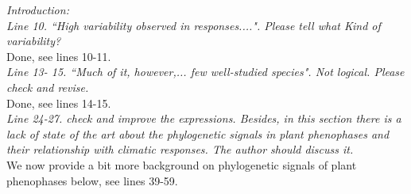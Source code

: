 \documentclass[11pt]{article}
\begin{document}
\emph{Introduction:}\\
\emph{Line 10. ``High variability observed in responses....". Please tell what Kind of variability?}\\
Done, see lines 10-11.\\

\emph{Line 13- 15. ``Much of it, however,... few well-studied species". Not logical. Please check and revise.}\\
Done, see lines 14-15.\\

\emph{Line 24-27. check and improve the expressions. Besides, in this section there is a lack of state of the art about the phylogenetic signals in plant phenophases and their relationship with climatic responses. The author should discuss it.}\\
We now provide a bit more background on phylogenetic signals of plant phenophases below, see lines 39-59.
\\
\end{document}
